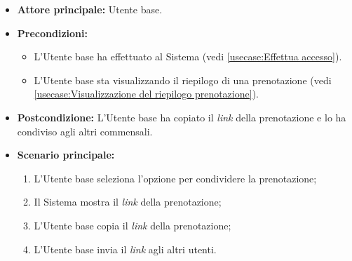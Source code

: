 \label{usecase:Condividi la prenotazione}
\begin{itemize}
	\item \textbf{Attore principale:} Utente base.

	\item \textbf{Precondizioni:}
	\begin{itemize}
		\item L'Utente base ha effettuato al Sistema (vedi \autoref{usecase:Effettua accesso}).
		\item L'Utente base sta visualizzando il riepilogo di una prenotazione (vedi \autoref{usecase:Visualizzazione del riepilogo prenotazione}).
	\end{itemize}

	\item \textbf{Postcondizione:}
	      L'Utente base ha copiato il \textit{link} della prenotazione e lo ha condiviso agli altri commensali.

	\item \textbf{Scenario principale:}
	      \begin{enumerate}
		      \item L'Utente base seleziona l'opzione per condividere la prenotazione;
		      \item Il Sistema mostra il \textit{link} della prenotazione;
		      \item L'Utente base copia il \textit{link} della prenotazione;
		      \item L'Utente base invia il \textit{link} agli altri utenti.
	      \end{enumerate}
\end{itemize}